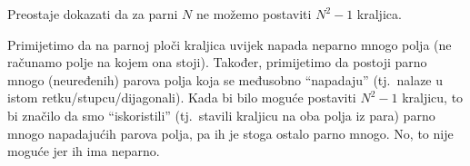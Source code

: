 Preostaje dokazati da za parni $N$ ne možemo postaviti $N^2 - 1$ kraljica.

Primijetimo da na parnoj ploči kraljica uvijek napada neparno mnogo polja (ne računamo polje na kojem ona stoji). Također, primijetimo da postoji parno mnogo (neuređenih) parova polja
koja se međusobno ``napadaju'' (tj.\ nalaze u istom retku/stupcu/dijagonali).
Kada bi bilo moguće postaviti $N^2 - 1$ kraljicu, to bi značilo da smo ``iskoristili''
(tj.\ stavili kraljicu na oba polja iz para) parno mnogo napadajućih parova polja, pa ih je
stoga ostalo parno mnogo. No, to nije moguće jer ih ima neparno.



